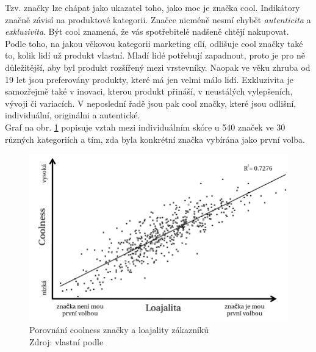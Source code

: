 Tzv.  značky lze chápat jako ukazatel toho, jako moc je značka cool. Indikátory značně závisí na produktové kategorii. Značce nicméně nesmí chybět \textit{autenticita} a \textit{exkluzivita}. Být cool znamená, že vás spotřebitelé nadšeně chtějí nakupovat.
Podle toho, na jakou věkovou kategorii marketing cílí, odlišuje cool značky také to, kolik lidí už produkt vlastní. Mladí lidé potřebují zapadnout, proto je pro ně důležitější, aby byl produkt rozšířený mezi vrstevníky. Naopak ve věku zhruba od 19 let jsou preferovány produkty, které má jen velmi málo lidí.\cite{bergh2012coolznacky}
Exkluzivita je samozřejmě také v inovaci, kterou produkt přináší, v neustálých vylepšeních, vývoji či variacích. V neposlední řadě jsou pak cool značky, které jsou odlišní, individuální, originálni a autentické.\\
Graf na obr. \ref{fig:coolness-vs-loyalty} popisuje vztah mezi individuálním skóre  u 540 značek ve 30 různých kategoriích a tím, zda byla konkrétní značka vybírána jako první volba.

\bigskip
\begin{figure}[htbp!]
    \centering
    \includegraphics[width=.95\textwidth]{assets/coolness-vs-loyalty.png}
    \caption[Porovnání coolness značky a loajality zákazníků]{Porovnání coolness značky a loajality zákazníků \\ Zdroj: vlastní podle \textcite[s. 95]{bergh2012coolznacky}}
    \label{fig:coolness-vs-loyalty}
\end{figure}
